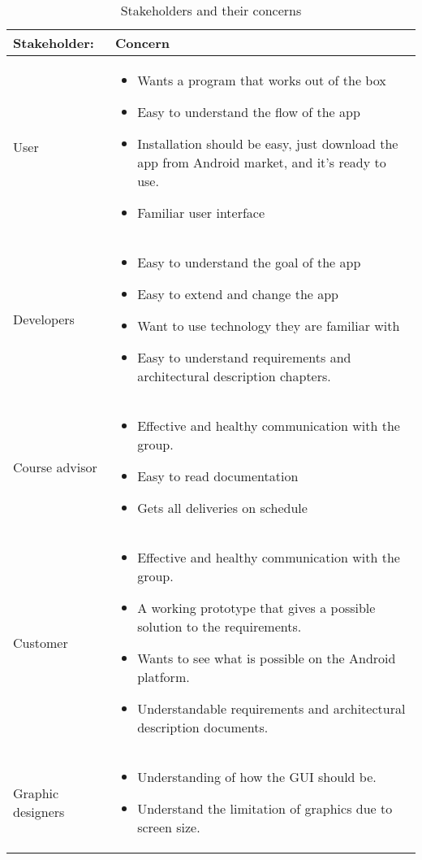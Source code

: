 \begin{table}
\begin{tabular}{p{3.5cm}|p{11.5cm}}
\textbf{Stakeholder:} & \textbf{Concern} \\ \hline \hline
User & 
\begin{itemize}
\item{} Wants a program that works out of the box
\item{} Easy to understand the flow of the app
\item{} Installation should be easy, just download the app from   Android market, and it’s ready to use.
\item{} Familiar user interface
\end{itemize}\\ \hline
Developers & 
\begin{itemize}
\item{}Easy to understand the goal of the app
\item{}Easy to extend and change the app
\item{}Want to use technology they are familiar with
\item{}Easy to understand requirements and architectural description chapters.
\end{itemize}\\ \hline
Course advisor & 
\begin{itemize}
\item{}Effective and healthy communication with the group.
\item{}Easy to read documentation
\item{}Gets all deliveries on schedule
\end{itemize}\\ \hline
Customer & 
\begin{itemize}
\item{}Effective and healthy communication with the group.
\item{}A working prototype that gives a possible solution to the requirements.
\item{}Wants to see what is possible on the Android platform.
\item{}Understandable requirements and architectural description documents.
\end{itemize}\\ \hline
Graphic designers & 
\begin{itemize}
\item{}Understanding of how the GUI should be.
\item{}Understand the limitation of graphics due to screen size.
\end{itemize}
\end{tabular}
\caption{Stakeholders and their concerns} \label{tab:stakeholders}
\end{table}